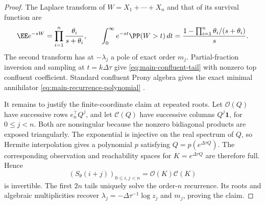 \begin{proof}
The Laplace transform of \(W=X_1+\cdots+X_n\) and that of its survival
function are
\begin{equation}
 \EE e^{-sW}=\prod_{i=1}^n\frac{\theta_i}{s+\theta_i},\qquad
 \int_0^\infty e^{-st}\PP(W>t)\,dt
 =\frac{1-\prod_{i=1}^n\theta_i/(s+\theta_i)}s.
\label{eq:main-survival-laplace}
\end{equation}
The second transform has at \(-\lambda_j\) a pole of exact order \(m_j\).
Partial-fraction inversion and sampling at \(t=k\Delta\tau\) give
\eqref{eq:main-confluent-tail} with nonzero top confluent coefficient.  Standard confluent
Prony algebra gives the exact minimal annihilator \eqref{eq:main-recurrence-polynomial}
\cite{KunisRoemerVonDerOhe2020Prony}.

It remains to justify the finite-coordinate claim at repeated roots.  Let
\(\mathcal O(Q)\) have successive rows \(e_n^\top Q^j\), and let
\(\mathcal C(Q)\) have successive columns \(Q^j\mathbf1\), for
\(0\le j<n\).  Both are nonsingular because the nonzero bidiagonal products
are exposed triangularly.  The exponential is injective on the real spectrum
of \(Q\), so Hermite interpolation gives a polynomial \(p\) satisfying
\(Q=p(e^{\Delta\tau Q})\).  The corresponding observation and reachability
spaces for \(K=e^{\Delta\tau Q}\) are therefore full.  Hence
\begin{equation}
 (S_\theta(i+j))_{0\le i,j<n}=\mathcal O(K)\mathcal C(K)
\label{eq:main-hankel-factorization}
\end{equation}
is invertible.  The first \(2n\) tails uniquely solve the order-\(n\)
recurrence.  Its roots and algebraic multiplicities recover
\(\lambda_j=-\Delta\tau^{-1}\log z_j\) and \(m_j\), proving the claim.
\end{proof}
